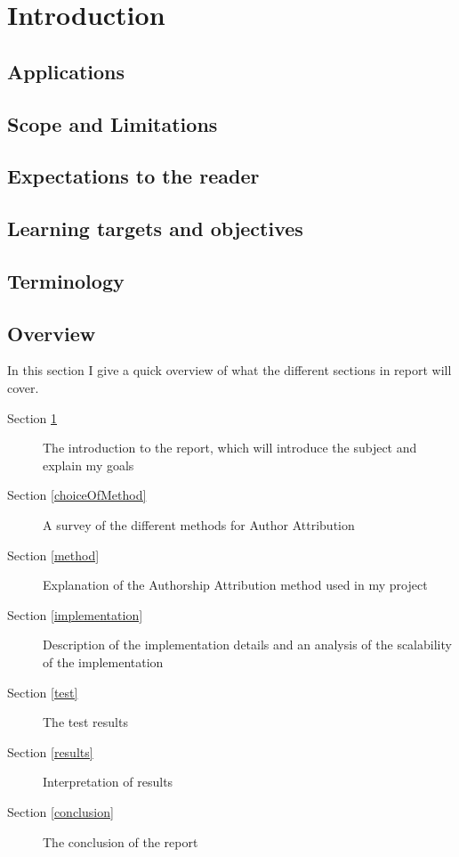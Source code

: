 \section{Introduction}
\label{introduction}


\subsection{Applications}

\subsection{Scope and Limitations}
\label{scope}

\subsection{Expectations to the reader}
\label{expectations}

\subsection{Learning targets and objectives}
\label{learning}

\subsection{Terminology}

\subsection{Overview}

In this section I give a quick overview of what the different sections in report will cover.
\begin{description}
\item[Section \ref{introduction}] The introduction to the report, which will introduce the subject and explain my goals
\item[Section \ref{choiceOfMethod}] A survey of the different methods for Author Attribution  
\item[Section \ref{method}] Explanation of the Authorship Attribution method used in my project
\item[Section \ref{implementation}] Description of the implementation details and an analysis of the scalability of the implementation
\item[Section \ref{test}] The test results
\item[Section \ref{results}] Interpretation of results
\item[Section \ref{conclusion}] The conclusion of the report  
\end{description}
